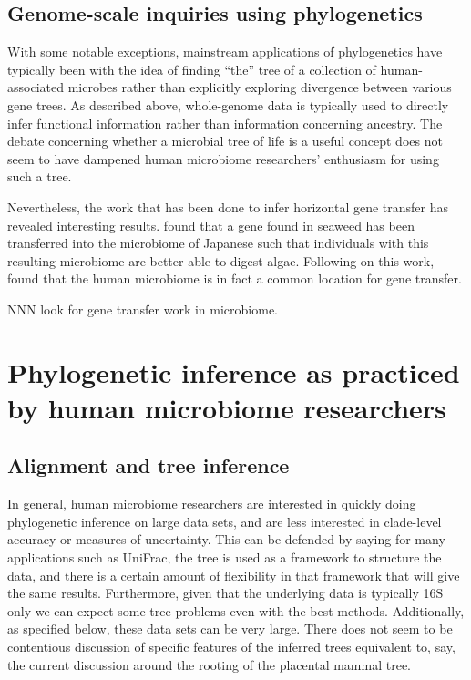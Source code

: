 \documentclass{amsart}
\begin{document}
\subsection{Genome-scale inquiries using phylogenetics}
With some notable exceptions, mainstream applications of phylogenetics have typically been with the idea of finding ``the'' tree of a collection of human-associated microbes rather than explicitly exploring divergence between various gene trees.
As described above, whole-genome data is typically used to directly infer functional information rather than information concerning ancestry.
The debate concerning whether a microbial tree of life is a useful concept does not seem to have dampened human microbiome researchers' enthusiasm for using such a tree.

Nevertheless, the work that has been done to infer horizontal gene transfer has revealed interesting results.
\citet{hehemann2010transfer} found that a gene found in seaweed has been transferred into the microbiome of Japanese such that individuals with this resulting microbiome are better able to digest algae.
Following on this work, \citet{smillie2011ecology} found that the human microbiome is in fact a common location for gene transfer.

NNN look for gene transfer work in microbiome.


\section{Phylogenetic inference as practiced by human microbiome researchers}

\subsection{Alignment and tree inference}
In general, human microbiome researchers are interested in quickly doing phylogenetic inference on large data sets, and are less interested in clade-level accuracy or measures of uncertainty.
This can be defended by saying for many applications such as UniFrac, the tree is used as a framework to structure the data, and there is a certain amount of flexibility in that framework that will give the same results.
Furthermore, given that the underlying data is typically 16S only we can expect some tree problems even with the best methods.
Additionally, as specified below, these data sets can be very large.
There does not seem to be contentious discussion of specific features of the inferred trees equivalent to, say, the current discussion around the rooting of the placental mammal tree.
\end{document}
